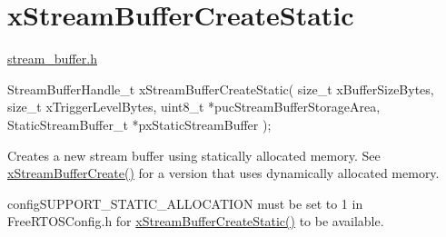 \hypertarget{group__x_stream_buffer_create_static}{}\section{x\+Stream\+Buffer\+Create\+Static}
\label{group__x_stream_buffer_create_static}
\hyperlink{stream__buffer_8h}{stream\+\_\+buffer.\+h}


\begin{DoxyPre}
  StreamBufferHandle\_t xStreamBufferCreateStatic( size\_t xBufferSizeBytes,
                                               size\_t xTriggerLevelBytes,
                                               uint8\_t *pucStreamBufferStorageArea,
                                               StaticStreamBuffer\_t *pxStaticStreamBuffer );
  \end{DoxyPre}
 Creates a new stream buffer using statically allocated memory. See \hyperlink{stream__buffer_8h_a39aa4dd8b83e2df7ded291f863fb5fed}{x\+Stream\+Buffer\+Create()} for a version that uses dynamically allocated memory.

config\+S\+U\+P\+P\+O\+R\+T\+\_\+\+S\+T\+A\+T\+I\+C\+\_\+\+A\+L\+L\+O\+C\+A\+T\+I\+ON must be set to 1 in Free\+R\+T\+O\+S\+Config.\+h for \hyperlink{stream__buffer_8h_a3c248575ac1b83801db605b32a118f77}{x\+Stream\+Buffer\+Create\+Static()} to be available.


